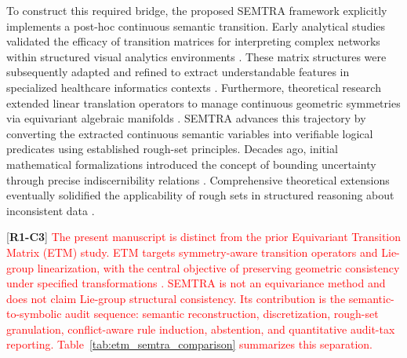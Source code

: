 \documentclass[make,article,submit,pdftex,moreauthors]{Definitions/mdpi}
\newcommand{\revtag}[2]{[\textbf{R#1-C#2}]}
\newcommand{\Rone}[1]{\textcolor{red}{#1}}
\begin{document}
To construct this required bridge, the proposed SEMTRA framework explicitly implements a post-hoc continuous semantic transition. Early analytical studies validated the efficacy of transition matrices for interpreting complex networks within structured visual analytics environments \cite{Radiuk2024TransitionMatrix}. These matrix structures were subsequently adapted and refined to extract understandable features in specialized healthcare informatics contexts \cite{Barmak2024TowardTransition}. Furthermore, theoretical research extended linear translation operators to manage continuous geometric symmetries via equivariant algebraic manifolds \cite{Radiuk2026EquivariantTransition}. SEMTRA advances this trajectory by converting the extracted continuous semantic variables into verifiable logical predicates using established rough-set principles. Decades ago, initial mathematical formalizations introduced the concept of bounding uncertainty through precise indiscernibility relations \cite{Pawlak1982RoughSets}. Comprehensive theoretical extensions eventually solidified the applicability of rough sets in structured reasoning about inconsistent data \cite{Pawlak1991RoughSets}.

\revtag{1}{3} \Rone{The present manuscript is distinct from the prior Equivariant Transition Matrix (ETM) study. ETM targets symmetry-aware transition operators and Lie-group linearization, with the central objective of preserving geometric consistency under specified transformations \cite{Radiuk2026EquivariantTransition}. SEMTRA is not an equivariance method and does not claim Lie-group structural consistency. Its contribution is the semantic-to-symbolic audit sequence: semantic reconstruction, discretization, rough-set granulation, conflict-aware rule induction, abstention, and quantitative audit-tax reporting. Table~\ref{tab:etm_semtra_comparison} summarizes this separation.}
\end{document}
